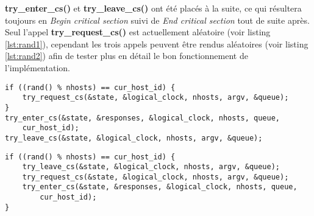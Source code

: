\begin{framehint}
\textbf{try\_enter\_cs()} et \textbf{try\_leave\_cs()} ont été placés à la suite, ce qui résultera toujours en \emph{Begin critical section} suivi de \emph{End critical section} tout de suite après. Seul l'appel \textbf{try\_request\_cs()} est actuellement aléatoire (voir listing \ref{lst:rand1}), cependant les trois appels peuvent être rendus aléatoires (voir listing \ref{lst:rand2}) afin de tester plus en détail le bon fonctionnement de l'implémentation.\\

\begin{lstlisting}[label={lst:rand1}, caption={Changement d'état aléatoire 1}, numbers=none]
if ((rand() % nhosts) == cur_host_id) {
    try_request_cs(&state, &logical_clock, nhosts, argv, &queue);
}
try_enter_cs(&state, &responses, &logical_clock, nhosts, queue,
    cur_host_id);
try_leave_cs(&state, &logical_clock, nhosts, argv, &queue);
\end{lstlisting}

\begin{lstlisting}[label={lst:rand2}, caption={Changement d'état aléatoire 2}, numbers=none]
if ((rand() % nhosts) == cur_host_id) {
    try_leave_cs(&state, &logical_clock, nhosts, argv, &queue);
    try_request_cs(&state, &logical_clock, nhosts, argv, &queue);
    try_enter_cs(&state, &responses, &logical_clock, nhosts, queue,
        cur_host_id);
}
\end{lstlisting}
\end{framehint}


